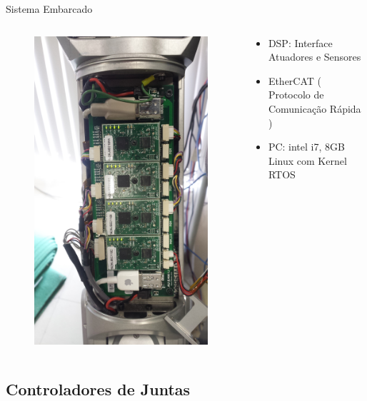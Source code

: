 \documentclass{beamer}
\begin{document}
\begin{frame}{Sistema Embarcado}
\begin{columns}
\begin{column}{0.5\textwidth}  %
\begin{figure}
    \centering
    \includegraphics[height = 0.7\linewidth, angle=270]{tex/figs/dsp-control-wrist.jpg}
    \label{fig:mekawristinside}
\end{figure}
\end{column}
\begin{column}{0.5\textwidth}
\begin{itemize}
    \item DSP: Interface Atuadores e Sensores
    \item EtherCAT ( Protocolo de Comunicação Rápida )
    \item PC: intel i7, 8GB Linux com Kernel RTOS
\end{itemize}
\end{column}
\end{columns}
\end{frame}

\subsection{Controladores de Juntas}
\end{document}
